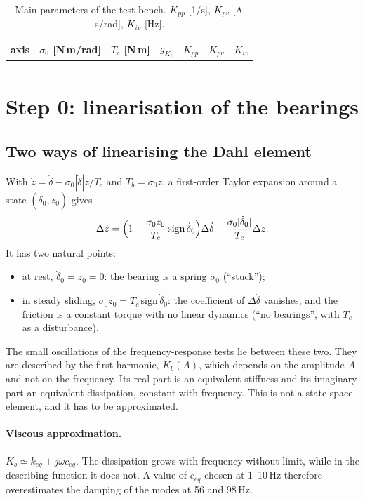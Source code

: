 \documentclass[10pt,a4paper]{article}
\numberwithin{equation}{section}
\begin{document}
\begin{table}[H]\centering\footnotesize
\caption{Main parameters of the test bench. $K_{pp}$ [1/s], $K_{pv}$ [A\,s/rad], $K_{iv}$ [Hz].}\label{tab:model}
\begin{tabular}{lrrrrrr}\toprule
axis & $\sigma_0$ [N\,m/rad] & $T_c$ [N\,m] & $g_{K_t}$ & $K_{pp}$ & $K_{pv}$ & $K_{iv}$ \\ \midrule
\\ \bottomrule
\end{tabular}\end{table}

\section{Step 0: linearisation of the bearings}\label{sec:step0}
\subsection{Two ways of linearising the Dahl element}
With $\dot z=\dot\delta-\sigma_0|\dot\delta|z/T_c$ and $T_b=\sigma_0z$, a first-order Taylor expansion around a state $(\dot\delta_0,z_0)$ gives
\begin{equation}
\Delta\dot z=\Bigl(1-\frac{\sigma_0z_0}{T_c}\,\mathrm{sign}\,\dot\delta_0\Bigr)\Delta\dot\delta-\frac{\sigma_0|\dot\delta_0|}{T_c}\Delta z .
\end{equation}
It has two natural points:
\begin{itemize}
\item at rest, $\dot\delta_0=z_0=0$: the bearing is a spring $\sigma_0$ (``stuck'');
\item in steady sliding, $\sigma_0z_0=T_c\,\mathrm{sign}\,\dot\delta_0$: the coefficient of $\Delta\dot\delta$ vanishes, and the friction is a constant torque with no linear dynamics (``no bearings'', with $T_c$ as a disturbance).
\end{itemize}
The small oscillations of the frequency-response tests lie between these two. They are described by the first harmonic, $K_b(A)$, which depends on the amplitude $A$ and not on the frequency. Its real part is an equivalent stiffness and its imaginary part an equivalent dissipation, constant with frequency. This is not a state-space element, and it has to be approximated.

\paragraph{Viscous approximation.} $K_b\simeq k_{eq}+j\omega c_{eq}$. The dissipation grows with frequency without limit, while in the describing function it does not. A value of $c_{eq}$ chosen at 1--10\,Hz therefore overestimates the damping of the modes at 56 and 98\,Hz.
\end{document}
